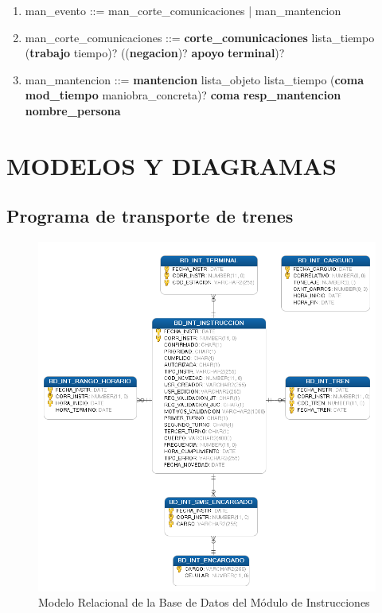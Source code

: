 \documentclass[oneside,12pt, letterpaper, titlepage]{book}
\begin{document}
\begin{appendices}
{\begin{enumerate}
\item man\_evento ::= man\_corte\_comunicaciones | man\_mantencion
\item man\_corte\_comunicaciones ::= \textbf{corte\_comunicaciones} lista\_tiempo (\textbf{trabajo} tiempo)? ((\textbf{negacion})? \textbf{apoyo} \textbf{terminal})?
\item man\_mantencion ::= \textbf{mantencion} lista\_objeto lista\_tiempo (\textbf{coma} \textbf{mod\_tiempo} maniobra\_concreta)? \textbf{coma} \textbf{resp\_mantencion} \textbf{nombre\_persona}

\end{enumerate}
}

\chapter[Modelos y Diagramas]{MODELOS Y DIAGRAMAS}

\section{Programa de transporte de trenes}
\begin{figure}[H]
    \centering
    \includegraphics[scale=0.6]{./images/BD_INSTRUCCIONES}
    \caption{Modelo Relacional de la Base de Datos del Módulo de Instrucciones}
    \label{fig:BD_INSTRUCCIONES}
\end{figure}


\end{appendices}
\end{document}
